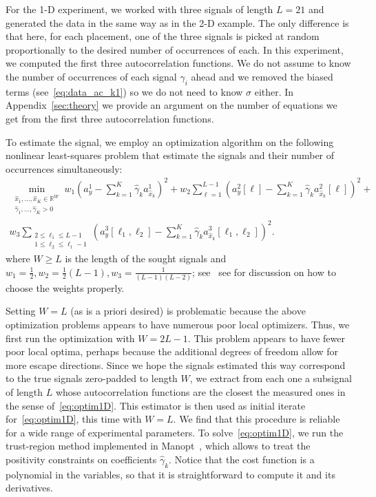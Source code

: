 \documentclass[english,11pt]{article}
\newcommand{\1}{\mathbf{1}}
\newcommand{\TODO}[1]{{\color{red}{[#1]}}}
\numberwithin{equation}{section}
\theoremstyle{plain}
\theoremstyle{definition}
\theoremstyle{remark}
\theoremstyle{plain}
\theoremstyle{remark}
\theoremstyle{plain}
\theoremstyle{plain}
\newcommand{\reals}{\mathbb{R}}
\begin{document}
For the 1-D experiment, we worked with three signals of length $L = 21$ and generated the data in the same way as in the 2-D example.
The only difference is that here, for each
placement, one of the three signals is picked at random proportionally to the desired number
of occurrences of each.
In this experiment, we computed the first three autocorrelation functions. 
We do not assume to know the number of occurrences of each signal $\gamma_i$ ahead and we removed the biased terms (see~\eqref{eq:data_ac_k1}) so we do not need to know $\sigma$ either. 
In Appendix~\ref{sec:theory} we provide an argument on the number of equations we get from the first three autocorrelation functions. 

To estimate the signal, we employ an optimization algorithm on the following nonlinear least-squares problem that estimate the signals and their number of occurrences simultaneously:
\begin{multline}
\min_{\substack{\hat x_1, \ldots, \hat x_K \in \reals^{W} \\ \hat \gamma_1, \ldots, \hat \gamma_K > 0}} w_1 \left( a_y^1 - \sum_{k=1}^K \hat \gamma_k a_{\hat x_k}^1 \right)^2 + w_2 \sum_{\ell = 1}^{L-1} \left( a_y^2[\ell] - \sum_{k=1}^K \hat \gamma_k a_{\hat x_k}^2[\ell] \right)^2 + \\ w_3 \sum_{\substack{2\leq\ell_1\leq L-1 \\ 1 \leq \ell_2 \leq \ell_1-1}} \left( a_y^3[\ell_1, \ell_2] - \sum_{k=1}^K \hat \gamma_k a_{\hat x_k}^3[\ell_1,\ell_2] \right)^2.
\label{eq:optim1D}
\end{multline}
where $W \geq L$ is the length of the sought signals and $w_1 = \frac{1}{2}, w_2 =\frac{1}{2}(L-1), w_3 = \frac{1}{(L-1)(L-2)}$; see~\cite{boumal2017heterogeneous} see for discussion on how to choose the weights properly.


 Setting $W = L$ (as is a priori desired) is problematic because the above optimization problems appears to have numerous poor local optimizers.
Thus, we first run the optimization with $W = 2L-1$. This problem appears to have fewer poor local optima, perhaps because the additional degrees of freedom allow for more escape directions. Since we hope the signals estimated this way correspond to the true signals zero-padded to length $W$, we extract from each one a subsignal of length $L$ whose autocorrelation functions are the closest the measured ones in the sense of~\eqref{eq:optim1D}. 
This estimator is then used as initial iterate for~\eqref{eq:optim1D}, this time with $W = L$. We find that this procedure is reliable for a wide range of experimental parameters. To solve~\eqref{eq:optim1D}, we run the trust-region method implemented in Manopt~\cite{manopt}, which allows to treat the positivity constraints \TODO{reference} on coefficients $\hat \gamma_k$. Notice that the cost function is a polynomial in the variables, so that it is straightforward to compute it and its derivatives.
\end{document}
